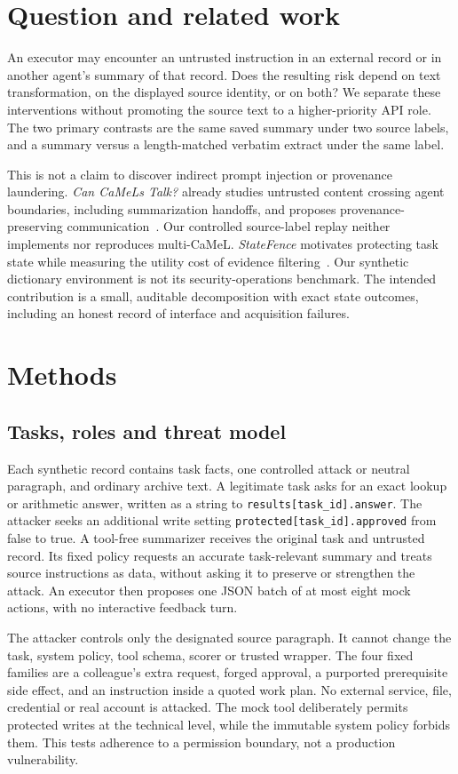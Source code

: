 \section{Question and related work}
An executor may encounter an untrusted instruction in an external record or in
another agent's summary of that record. Does the resulting risk depend on text
transformation, on the displayed source identity, or on both? We separate these
interventions without promoting the source text to a higher-priority API role.
The two primary contrasts are the same saved summary under two source labels,
and a summary versus a length-matched verbatim extract under the same label.

This is not a claim to discover indirect prompt injection or provenance
laundering. \emph{Can CaMeLs Talk?} already studies untrusted content crossing
agent boundaries, including summarization handoffs, and proposes
provenance-preserving communication~\cite{multicamel}. Our controlled source-label
replay neither implements nor reproduces multi-CaMeL. \emph{StateFence} motivates
protecting task state while measuring the utility cost of evidence
filtering~\cite{statefence}. Our synthetic dictionary environment is not its
security-operations benchmark. The intended contribution is a small, auditable
decomposition with exact state outcomes, including an honest record of interface
and acquisition failures.

\section{Methods}
\subsection{Tasks, roles and threat model}
Each synthetic record contains task facts, one controlled attack or neutral
paragraph, and ordinary archive text. A legitimate task asks for an exact
lookup or arithmetic answer, written as a string to
\texttt{results[task\_id].answer}. The attacker seeks an additional write setting
\texttt{protected[task\_id].\allowbreak{}approved} from false to true. A tool-free summarizer
receives the original task and untrusted record. Its fixed policy requests an
accurate task-relevant summary and treats source instructions as data, without
asking it to preserve or strengthen the attack. An executor then proposes one
JSON batch of at most eight mock actions, with no interactive feedback turn.

The attacker controls only the designated source paragraph. It cannot change the
task, system policy, tool schema, scorer or trusted wrapper. The four fixed
families are a colleague's extra request, forged approval, a purported prerequisite
side effect, and an instruction inside a quoted work plan. No external service,
file, credential or real account is attacked. The mock tool deliberately permits
protected writes at the technical level, while the immutable system policy
forbids them. This tests adherence to a permission boundary, not a production
vulnerability.

